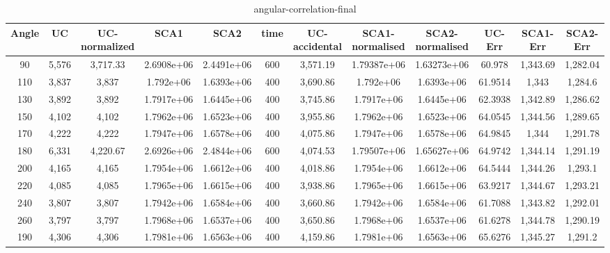 \begin{table} 
 \caption{angular-correlation-final}
\begin{tabular}{|*{12}{c|}}
\hline 
Angle & UC & UC-normalized & SCA1 & SCA2 & time & UC-accidental & SCA1-normalised & SCA2-normalised & UC-Err & SCA1-Err & SCA2-Err\\ \hline 
90 & 5,576 & 3,717.33 & 2.6908e+06 & 2.4491e+06 & 600 & 3,571.19 & 1.79387e+06 & 1.63273e+06 & 60.978 & 1,343.69 & 1,282.04 \\ \hline 
 110 & 3,837 & 3,837 & 1.792e+06 & 1.6393e+06 & 400 & 3,690.86 & 1.792e+06 & 1.6393e+06 & 61.9514 & 1,343 & 1,284.6 \\ \hline 
 130 & 3,892 & 3,892 & 1.7917e+06 & 1.6445e+06 & 400 & 3,745.86 & 1.7917e+06 & 1.6445e+06 & 62.3938 & 1,342.89 & 1,286.62 \\ \hline 
 150 & 4,102 & 4,102 & 1.7962e+06 & 1.6523e+06 & 400 & 3,955.86 & 1.7962e+06 & 1.6523e+06 & 64.0545 & 1,344.56 & 1,289.65 \\ \hline 
 170 & 4,222 & 4,222 & 1.7947e+06 & 1.6578e+06 & 400 & 4,075.86 & 1.7947e+06 & 1.6578e+06 & 64.9845 & 1,344 & 1,291.78 \\ \hline 
 180 & 6,331 & 4,220.67 & 2.6926e+06 & 2.4844e+06 & 600 & 4,074.53 & 1.79507e+06 & 1.65627e+06 & 64.9742 & 1,344.14 & 1,291.19 \\ \hline 
 200 & 4,165 & 4,165 & 1.7954e+06 & 1.6612e+06 & 400 & 4,018.86 & 1.7954e+06 & 1.6612e+06 & 64.5444 & 1,344.26 & 1,293.1 \\ \hline 
 220 & 4,085 & 4,085 & 1.7965e+06 & 1.6615e+06 & 400 & 3,938.86 & 1.7965e+06 & 1.6615e+06 & 63.9217 & 1,344.67 & 1,293.21 \\ \hline 
 240 & 3,807 & 3,807 & 1.7942e+06 & 1.6584e+06 & 400 & 3,660.86 & 1.7942e+06 & 1.6584e+06 & 61.7088 & 1,343.82 & 1,292.01 \\ \hline 
 260 & 3,797 & 3,797 & 1.7968e+06 & 1.6537e+06 & 400 & 3,650.86 & 1.7968e+06 & 1.6537e+06 & 61.6278 & 1,344.78 & 1,290.19 \\ \hline 
 190 & 4,306 & 4,306 & 1.7981e+06 & 1.6563e+06 & 400 & 4,159.86 & 1.7981e+06 & 1.6563e+06 & 65.6276 & 1,345.27 & 1,291.2 \\ \hline 
 \end{tabular} 
\end{table} 
